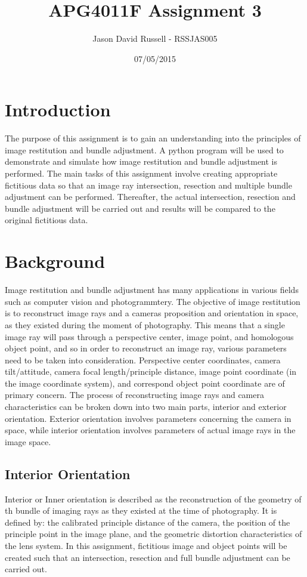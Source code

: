 \documentclass{article}
\title{APG4011F Assignment 3}
\date{07/05/2015}
\author{Jason David Russell - RSSJAS005}
\begin{document}
\maketitle
{}

\newpage
\tableofcontents
{}

\newpage
\section{Introduction}
The purpose of this assignment is to gain an understanding into the principles of image restitution and bundle adjustment.
A python program will be used to demonstrate and simulate how image restitution and bundle adjustment is performed.
The main tasks of this assignment involve creating appropriate fictitious data so that an image ray intersection, resection
and multiple bundle adjustment can be performed. Thereafter, the actual intersection, resection and bundle adjustment will
be carried out and results will be compared to the original fictitious data.


\section{Background}
Image restitution and bundle adjustment has many applications in various fields such as computer vision and photogrammtery.
The objective of image restitution is to reconstruct image rays and a cameras proposition and orientation in space, as they existed during the moment of photography.
This means that a single image ray will pass through a perspective center, image point, and homologous object point, and so
in order to reconstruct an image ray, various parameters need to be taken into consideration.
Perspective center coordinates, camera tilt/attitude, camera focal length/principle distance, image point coordinate (in the
image coordinate system), and correspond object point coordinate are of primary concern.
The process of reconstructing image rays and camera characteristics can be broken down into two main parts, interior and exterior orientation.
Exterior orientation involves parameters concerning the camera in space, while interior orientation involves parameters of actual image rays in the
image space.

\newpage
\subsection{Interior Orientation}
Interior or Inner orientation is described as the reconstruction of the geometry of th bundle of imaging rays as they existed at the time
of photography. It is defined by: the calibrated principle distance of the camera, the position of the principle point in the image plane,
and the geometric distortion characteristics of the lens system.
In this assignment, fictitious image and object points will be created such that an intersection, resection and full bundle adjustment
can be carried out.
\end{document}
